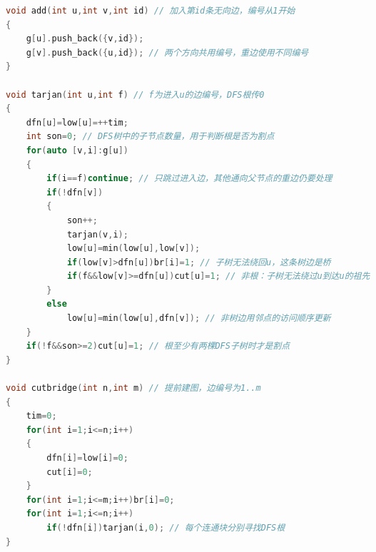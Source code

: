 \documentclass[10pt,landscape,a4paper]{article}
\begin{document}
\begin{multicols*}{3}
\begin{lstlisting}[language=C++]
void add(int u,int v,int id) // 加入第id条无向边，编号从1开始
{
    g[u].push_back({v,id});
    g[v].push_back({u,id}); // 两个方向共用编号，重边使用不同编号
}

void tarjan(int u,int f) // f为进入u的边编号，DFS根传0
{
    dfn[u]=low[u]=++tim;
    int son=0; // DFS树中的子节点数量，用于判断根是否为割点
    for(auto [v,i]:g[u])
    {
        if(i==f)continue; // 只跳过进入边，其他通向父节点的重边仍要处理
        if(!dfn[v])
        {
            son++;
            tarjan(v,i);
            low[u]=min(low[u],low[v]);
            if(low[v]>dfn[u])br[i]=1; // 子树无法绕回u，这条树边是桥
            if(f&&low[v]>=dfn[u])cut[u]=1; // 非根：子树无法绕过u到达u的祖先
        }
        else
            low[u]=min(low[u],dfn[v]); // 非树边用邻点的访问顺序更新
    }
    if(!f&&son>=2)cut[u]=1; // 根至少有两棵DFS子树时才是割点
}

void cutbridge(int n,int m) // 提前建图，边编号为1..m
{
    tim=0;
    for(int i=1;i<=n;i++)
    {
        dfn[i]=low[i]=0;
        cut[i]=0;
    }
    for(int i=1;i<=m;i++)br[i]=0;
    for(int i=1;i<=n;i++)
        if(!dfn[i])tarjan(i,0); // 每个连通块分别寻找DFS根
}
\end{lstlisting}

\end{multicols*}
\end{document}
